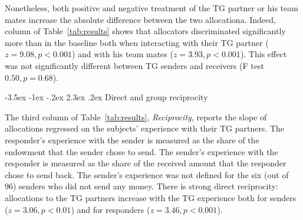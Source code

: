 \documentclass[12pt,a4paper]{article}\usepackage[]{graphicx}\usepackage[]{color}
\makeatletter
\renewcommand\subsection{\@startsection {subsection}{1}{\z@}%
{-3.5ex \@plus -1ex \@minus -.2ex}%
{2.3ex \@plus.2ex}%
{\it\large}}
\makeatother
\begin{document}
Nonetheless, both positive and negative treatment of the TG partner or his team mates increase the absolute difference between the two allocationa. Indeed,
column of Table~\ref{tab:results} shows that allocators discriminated significantly more
than in the baseline both when interacting with their TG partner
($z=9.08,p< 0.001$) and with his team mates 
($z=3.93,p< 0.001$). This effect was not
significantly different between TG senders and receivers (F test $0.50,
p= 0.68$).

\subsection{Direct and group reciprocity}
\label{sec:reciprocity}

The third column of Table~\ref{tab:results}, \emph{Reciprocity}, reports the slope of
allocations regressed on the subjects' experience with their TG partners. 
The responder's experience with the sender is measured
as the share of the endowment that the sender chose to send. The sender's experience with the responder is measured as the share
of the received amount that the responder chose to send back. 
The sender's experience was not defined
for the six (out of 96) senders who did not send any money.
%
There is strong direct reciprocity: allocations
to the TG partners increase with the TG experience both for
senders ($z=3.06,p< 0.01$) and for responders 
($z=3.46,p< 0.001$).
\end{document}
